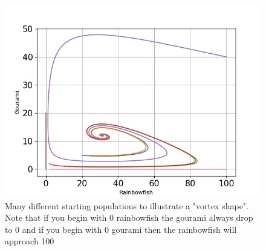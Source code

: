 \begin{figure}[H]
    \centering
    \includegraphics[scale=0.4]{../figures/Figure_4.png}
    \caption{Many different starting populations to illustrate a "vortex shape".
        Note that if you begin
        with 0 rainbowfish the gourami always drop to 0 and if you begin with 0
        gourami then the rainbowfish will approach 100}
    \label{vortex}
\end{figure}


